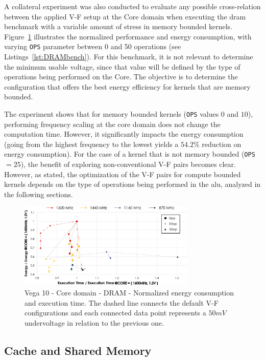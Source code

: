 A collateral experiment was also conducted to evaluate any possible cross-relation between the applied V-F setup at the Core domain when executing the \acrshort{dram} benchmark with a variable amount of stress in memory bounded kernels. Figure~\ref{fig:DRAM_Corebehaviour} illustrates the normalized performance and energy consumption, with varying \texttt{OPS} parameter between 0 and 50 operations (see Listings~\ref{lst:DRAMbench}). For this benchmark, it is not relevant to determine the minimum usable voltage, since that value will be defined by the type of operations being performed on the Core. The objective is to determine the configuration that offers the best energy efficiency for kernels that are memory bounded.  

The experiment shows that for memory bounded kernels (\texttt{OPS} values $0$ and $10$), performing frequency scaling at the core domain does not change the computation time. However, it significantly impacts the energy consumption (going from the highest frequency to the lowest yields a $54.2\%$ reduction on energy consumption). For the case of a kernel that is not memory bounded  (\texttt{OPS} $=25$), the benefit of exploring non-conventional V-F pairs becomes clear. However, as stated, the optimization of the V-F pairs for compute bounded kernels depends on the type of operations being performed in the \acrshort{alu}, analyzed in the following sections.

\begin{figure}[htb]
  \centering
  \includegraphics[width=0.75\textwidth]{Figures/GPU_characterization/DRAM_Core_domain_behaviour.pdf}
  \caption{Vega 10 - Core domain - DRAM - Normalized energy consumption and execution time. The dashed line connects the default V-F configurations and each connected data point represents a $50mV$ undervoltage in relation to the previous one.}
  \label{fig:DRAM_Corebehaviour}
\end{figure}


\subsection{Cache and Shared Memory}

